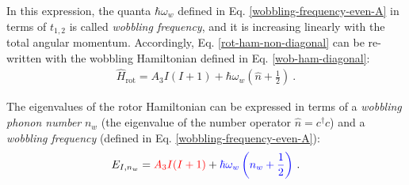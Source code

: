 In this expression, the quanta $\hbar\omega_w$ defined in Eq. \ref{wobbling-frequency-even-A} in terms of $t_{1,2}$ is called \emph{wobbling frequency}, and it is increasing linearly with the total angular momentum. Accordingly, Eq. \ref{rot-ham-non-diagonal} can be re-written with the wobbling Hamiltonian defined in Eq. \ref{wob-ham-diagonal}:
\begin{align}
    \hat{H}_\text{rot}=A_3I(I+1)+\hbar\omega_w\left(\hat{n}+\frac{1}{2}\right)\ .
    \label{rot-wob-ham-diagonal}
\end{align}

The eigenvalues of the rotor Hamiltonian can be expressed in terms of a \emph{wobbling phonon number} $n_w$ (the eigenvalue of the number operator $\hat{n}=c^\dagger c$) and a \emph{wobbling frequency} (defined in Eq. \ref{wobbling-frequency-even-A}):
\begin{align}
    E_{I,n_w}={\color{red}A_3I(I+1)}+{\color{blue}\hbar\omega_w\left(n_w+\frac{1}{2}\right)}\ .
    \label{eq-wobbling-energy-evenA}
\end{align}

